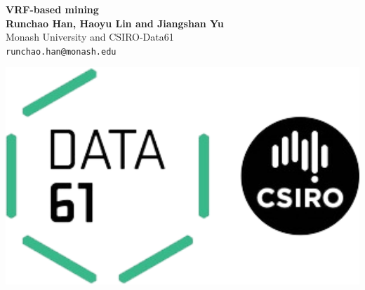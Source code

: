 \documentclass[a0,portrait]{a0poster}
\begin{document}


\begin{minipage}[b]{0.75\linewidth}
    \veryHuge \color{NavyBlue} \textbf{VRF-based mining} \color{Black}\\ %
    \huge \textbf{Runchao Han, Haoyu Lin and Jiangshan Yu}\\[0.5cm] %
    \huge Monash University and CSIRO-Data61\\[0.4cm] %
    \Large \texttt{runchao.han@monash.edu}\\
\end{minipage}
%
\begin{minipage}[b]{0.25\linewidth}
    \includegraphics[width=20cm]{data61-logo.png}\\
\end{minipage}

\vspace{1cm} %

\end{document}
